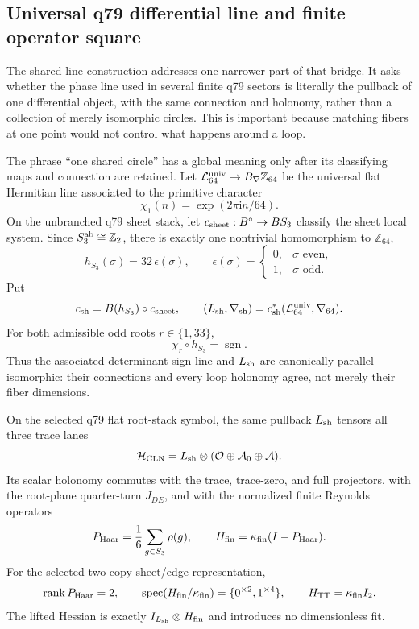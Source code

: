 \documentclass[11pt]{article}
\begin{document}
\subsection{Universal q79 differential line and finite operator square}

The shared-line construction addresses one narrower part of that bridge. It
asks whether the phase line used in several finite q79 sectors is literally
the pullback of one differential object, with the same connection and
holonomy, rather than a collection of merely isomorphic circles. This is
important because matching fibers at one point would not control what happens
around a loop.

The phrase ``one shared circle'' has a global meaning only after its
classifying maps and connection are retained. Let
$\mathcal L_{64}^{\rm univ}\to B_\nabla\mathbb Z_{64}$ be the universal flat
Hermitian line associated to the primitive character
\[
 \chi_1(n)=\exp(2\pi\mathrm i n/64).
\]
On the unbranched q79 sheet stack, let
$c_{\rm sheet}:B^\circ\to BS_3$ classify the sheet local system. Since
$S_3^{\rm ab}\cong\mathbb Z_2$, there is exactly one nontrivial homomorphism
to $\mathbb Z_{64}$,
\[
 h_{S_3}(\sigma)=32\,\epsilon(\sigma),
 \qquad \epsilon(\sigma)=
 \begin{cases}0,&\sigma\text{ even},\\1,&\sigma\text{ odd}.
 \end{cases}
\]
Put
\[
 c_{\rm sh}=B(h_{S_3})\circ c_{\rm sheet},
 \qquad
 (L_{\rm sh},\nabla_{\rm sh})
 =c_{\rm sh}^{*}(\mathcal L_{64}^{\rm univ},\nabla_{64}).
\]
For both admissible odd roots $r\in\{1,33\}$,
\[
 \chi_r\circ h_{S_3}=\operatorname{sgn}.
\]
Thus the associated determinant sign line and $L_{\rm sh}$ are canonically
parallel-isomorphic: their connections and every loop holonomy agree, not
merely their fiber dimensions.

\begin{theorem}
\label{thm:shared-line}
On the selected q79 flat root-stack symbol, the same pullback
$L_{\rm sh}$ tensors all three trace lanes
\[
 \mathcal H_{\rm CLN}
 =L_{\rm sh}\otimes(\mathcal O\oplus\mathcal A_0\oplus\mathcal A).
\]
Its scalar holonomy commutes with the trace, trace-zero, and full projectors,
with the root-plane quarter-turn $J_{DE}$, and with the normalized finite
Reynolds operators
\[
 P_{\rm Haar}=\frac1{6}\sum_{g\in S_3}\rho(g),
 \qquad
 H_{\rm fin}=\kappa_{\rm fin}(I-P_{\rm Haar}).
\]
For the selected two-copy sheet/edge representation,
\[
 \operatorname{rank}P_{\rm Haar}=2,
 \qquad
 \operatorname{spec}(H_{\rm fin}/\kappa_{\rm fin})
 =\{0^{\times2},1^{\times4}\},
 \qquad H_{\rm TT}=\kappa_{\rm fin}I_2.
\]
The lifted Hessian is exactly
$I_{L_{\rm sh}}\otimes H_{\rm fin}$ and introduces no dimensionless fit.
\end{theorem}
\end{document}
